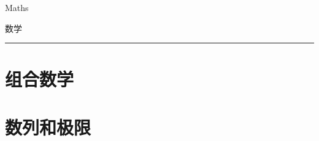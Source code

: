 \documentclass{ctexbook}
\begin{document}
\sqTurnOffAlerts
{\Huge Maths \par \vspace{1.5em} 数学}

\rule{\textwidth}{1pt}

{\Huge{}}

{\tableofcontents}

\chapter{组合数学}
\chapter{数列和极限}
\end{document}

